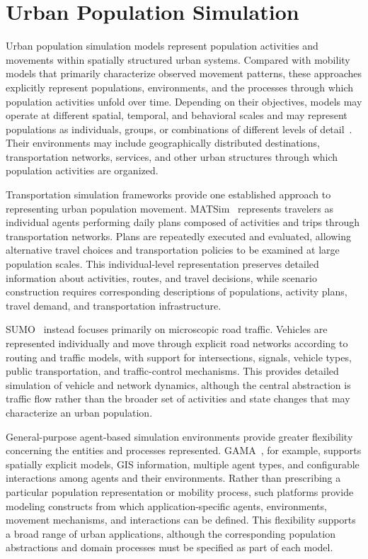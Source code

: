 \section{Urban Population Simulation}
\label{related:multilevel_urban_simulation}

Urban population simulation models represent population activities and movements within spatially structured urban systems. Compared with mobility models that primarily characterize observed movement patterns, these approaches explicitly represent populations, environments, and the processes through which population activities unfold over time. Depending on their objectives, models may operate at different spatial, temporal, and behavioral scales and may represent populations as individuals, groups, or combinations of different levels of detail~\cite{serana2023multilevelmodeling}. Their environments may include geographically distributed destinations, transportation networks, services, and other urban structures through which population activities are organized.

Transportation simulation frameworks provide one established approach to representing urban population movement. MATSim~\cite{balmer2009matsim,balmer2011matsim} represents travelers as individual agents performing daily plans composed of activities and trips through transportation networks. Plans are repeatedly executed and evaluated, allowing alternative travel choices and transportation policies to be examined at large population scales. This individual-level representation preserves detailed information about activities, routes, and travel decisions, while scenario construction requires corresponding descriptions of populations, activity plans, travel demand, and transportation infrastructure.

SUMO~\cite{krajzewicz2012sumo} instead focuses primarily on microscopic road traffic. Vehicles are represented individually and move through explicit road networks according to routing and traffic models, with support for intersections, signals, vehicle types, public transportation, and traffic-control mechanisms. This provides detailed simulation of vehicle and network dynamics, although the central abstraction is traffic flow rather than the broader set of activities and state changes that may characterize an urban population.

General-purpose agent-based simulation environments provide greater flexibility concerning the entities and processes represented. GAMA~\cite{taillandier2019gama}, for example, supports spatially explicit models, GIS information, multiple agent types, and configurable interactions among agents and their environments. Rather than prescribing a particular population representation or mobility process, such platforms provide modeling constructs from which application-specific agents, environments, movement mechanisms, and interactions can be defined. This flexibility supports a broad range of urban applications, although the corresponding population abstractions and domain processes must be specified as part of each model.

